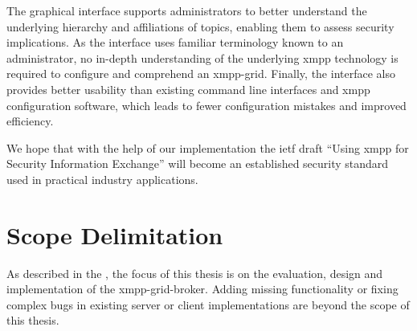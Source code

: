 The graphical interface supports administrators to better understand the underlying hierarchy and affiliations of \glspl{topic}, enabling them to assess security implications.
As the interface uses familiar terminology known to an administrator, no in-depth understanding of the underlying \gls{xmpp} technology is required to configure and comprehend an \gls{xmpp-grid}.
Finally, the interface also provides better usability than existing command line interfaces and \gls{xmpp} configuration software, which leads to fewer configuration mistakes and improved efficiency.

We hope that with the help of our implementation the \gls{ietf} draft ``Using \gls{xmpp} for Security Information Exchange'' will become an established security standard used in practical industry applications.

\section{Scope Delimitation} %
As described in the , the focus of this thesis is on the evaluation, design and implementation of the \gls{xmpp-grid-broker}.
Adding missing functionality or fixing complex bugs in existing server or client implementations are beyond the scope of this thesis.
